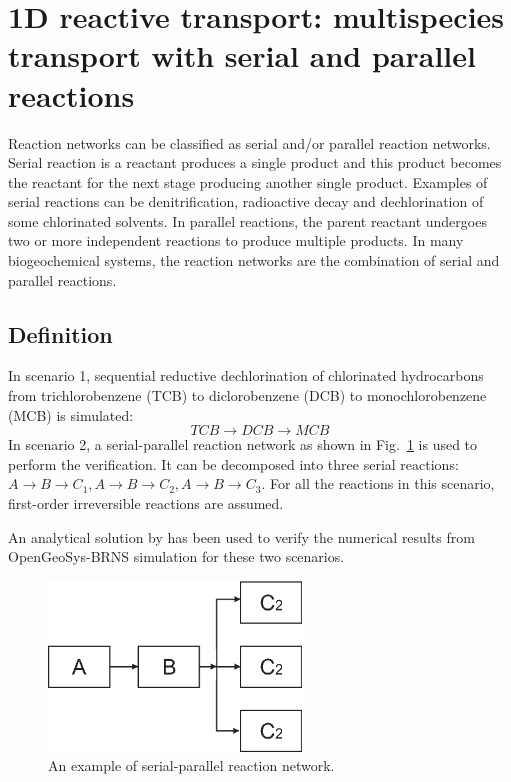 \section [Serial and Parallel Reactions (1D)]{1D reactive transport: multispecies transport with serial and parallel reactions }
\label{benchmark_1d_chain_reaction}

Reaction networks can be classified as serial and/or parallel reaction networks. Serial reaction is a reactant produces a single product and this product becomes the reactant for the next stage producing another single product. Examples of serial reactions can be denitrification, radioactive decay and dechlorination of some chlorinated solvents. In parallel reactions,  the parent reactant undergoes two or more independent reactions to produce multiple products. In many biogeochemical systems, the reaction networks are the combination of serial and parallel reactions. 

\subsection{Definition}

In scenario 1, sequential reductive dechlorination of chlorinated hydrocarbons from trichlorobenzene (TCB) to diclorobenzene (DCB) to monochlorobenzene (MCB) is simulated:
\begin{equation}
TCB \rightarrow DCB \rightarrow MCB
\end{equation}
In scenario 2, a serial-parallel reaction network as shown in Fig.~\ref{chain_reactions} is used to perform the verification. It can be decomposed into three serial reactions: $A \rightarrow B \rightarrow C_1, A \rightarrow B \rightarrow C_2, A \rightarrow B \rightarrow C_3$. For all the reactions in this scenario, first-order irreversible reactions are assumed. 

An analytical solution by \cite{Sun:1999} has been used to verify the numerical results from OpenGeoSys-BRNS simulation for these two scenarios. 

\begin{figure}[htbp]
\centering
\includegraphics[width=0.6\textwidth]{PART_III/HC/Chain_Reaction_Figure1_Serial_Pararrel_Reactions.eps}
\caption{An example of serial-parallel reaction network. }
\label{chain_reactions}
\end{figure}

